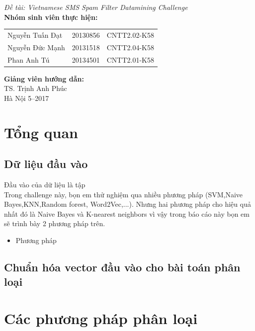 \documentclass[a4paper,12pt]{report}
\renewcommand{\contentsname}{Mục lục}
\begin{document}
\begin{center}
{\fontsize{18}{20}\selectfont \emph{Đề tài:  Vietnamese SMS Spam Filter Datamining Challenge }}\\[2cm]
\hspace{-5cm}\fontsize{14}{16}\selectfont \textbf{Nhóm sinh viên thực hiện:}\\[0.1cm] 
\begin{longtable}{l c c}
Nguyễn Tuấn Đạt & 20130856 & CNTT2.02-K58 \\
Nguyễn Đức Mạnh & 20131518 & CNTT2.04-K58\\
Phan Anh Tú &   20134501 & CNTT2.01-K58\\
\end{longtable}

\hspace{-6cm}\fontsize{14}{16}\selectfont \textbf{Giảng viên hướng dẫn:}\\[0.1cm]
\hspace{-2.7cm}\fontsize{14}{16}\selectfont TS. Trịnh Anh Phúc \\[3.0cm]
\fontsize{16}{19}\selectfont Hà Nội 5--2017
\end{center}
\newpage
\pdfbookmark{\contentsname}{toc}
\tableofcontents
\listoffigures

\chapter{Tổng quan}
\section{Dữ liệu đầu vào}
Đầu vào của dữ liệu là tập \\
Trong challenge này, bọn em thử nghiệm qua nhiều phương pháp (SVM,Naive Bayes,KNN,Random forest, Word2Vec,...). Nhưng hai phương pháp cho hiệu quả nhất đó là Naive Bayes và K-nearest neighbors vì vậy trong báo cáo này bọn em sẽ trình bày 2 phương pháp trên.
\begin{itemize}
\item Phương pháp
\end{itemize}
\section{Chuẩn hóa vector đầu vào cho bài toán phân loại}
\chapter{Các phương pháp phân loại}
\end{document}
